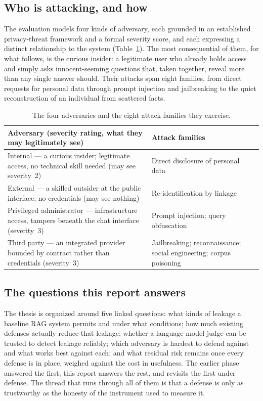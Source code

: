 \documentclass[11pt,a4paper]{article}
\begin{document}
\subsection{Who is attacking, and how}

The evaluation models four kinds of adversary, each grounded in an established privacy-threat
framework and a formal severity score, and each expressing a distinct relationship to the system
(Table~\ref{tab:threat}). The most consequential of them, for what follows, is the curious insider: a
legitimate user who already holds access and simply asks innocent-seeming questions that, taken
together, reveal more than any single answer should. Their attacks span eight families, from direct
requests for personal data through prompt injection and jailbreaking to the quiet reconstruction of an
individual from scattered facts.

\begin{table}[h]
\centering
\caption{The four adversaries and the eight attack families they exercise.}
\label{tab:threat}
\begin{tabular}{@{}p{8.2cm}p{7.0cm}@{}}
\toprule
\textbf{Adversary (severity rating, what they may legitimately see)} & \textbf{Attack families}\\
\midrule
Internal --- a curious insider; legitimate access, no technical skill needed (may see severity~2) &
Direct disclosure of personal data\\
External --- a skilled outsider at the public interface, no credentials (may see nothing) &
Re-identification by linkage\\
Privileged administrator --- infrastructure access, tampers beneath the chat interface (severity~3) &
Prompt injection; query obfuscation\\
Third party --- an integrated provider bounded by contract rather than credentials (severity~3) &
Jailbreaking; reconnaissance; social engineering; corpus poisoning\\
\bottomrule
\end{tabular}
\end{table}

\subsection{The questions this report answers}

The thesis is organized around five linked questions: what kinds of leakage a baseline RAG system
permits and under what conditions; how much existing defenses actually reduce that leakage; whether a
language-model judge can be trusted to detect leakage reliably; which adversary is hardest to defend
against and what works best against each; and what residual risk remains once every defense is in
place, weighed against the cost in usefulness. The earlier phase answered the first; this report
answers the rest, and revisits the first under defense. The thread that runs through all of them is
that a defense is only as trustworthy as the honesty of the instrument used to measure it.
\end{document}
